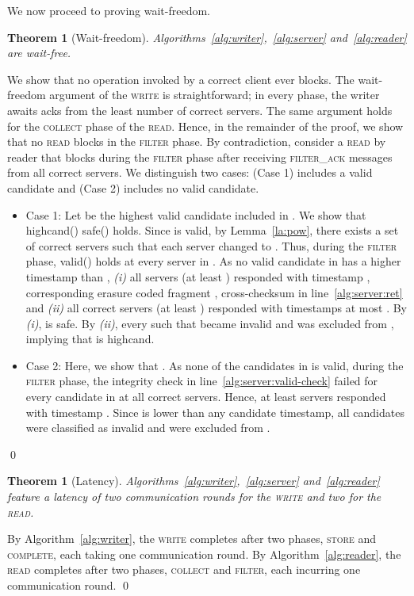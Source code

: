 \documentclass[10pt,conference,compsocconf]{IEEEtran}
\newcommand{\complete}{\textsc{complete}}
\newtheorem{theo}[defn]{Theorem}
\newenvironment{prooff}{\vspace{1ex}\noindent{\bf Proof:}\hspace{0.5em}}
	{\hfill\qed\vspace{1em}}
\begin{document}
We now proceed to proving wait-freedom.
\begin{theo}[Wait-freedom] Algorithms~\ref{alg:writer},~\ref{alg:server} and~\ref{alg:reader} are wait-free.
\end{theo}
\begin{prooff} We show that no operation invoked by a correct client ever blocks. The wait-freedom argument of the \textsc{write} is straightforward; in every phase, the writer awaits acks from the least number  of correct servers. The same argument holds for the \textsc{collect} phase of the \textsc{read}. Hence, in the remainder of the proof, we show that no \textsc{read} blocks in the \textsc{filter} phase. By contradiction, consider a \textsc{read}  by reader  that blocks during the \textsc{filter} phase after receiving \textsc{filter\_ack} messages from all correct servers. We distinguish two cases: (Case 1)  includes a valid candidate and (Case 2)  includes no valid candidate.

\begin{itemize}
\item Case 1: Let  be the highest valid candidate included in . We show that \textsf{highcand}()  \textsf{safe}() holds. Since  is valid, by Lemma~\ref{la:pow}, there exists a set  of  correct servers such that each server  changed  to . Thus, during the \textsc{filter} phase, \textsf{valid}() holds at every server in . As no valid candidate in  has a higher timestamp than , \textit{(i)} all servers  (at least ) responded with timestamp , corresponding erasure coded fragment , cross-checksum  in line~\ref{alg:server:ret} and \textit{(ii)} all correct servers (at least ) responded with timestamps at most . By \emph{(i)},  is \textsf{safe}. By \emph{(ii)}, every  such that  became \textsf{invalid} and was excluded from , implying that  is \textsf{highcand}.

\item Case 2: Here, we show that . As none of the candidates in  is valid, during the \textsc{filter} phase, the integrity check in line~\ref{alg:server:valid-check} failed for every candidate in  at all correct servers. Hence, at least  servers responded with timestamp . Since  is lower than any candidate timestamp, all candidates were classified as \textsf{invalid} and were excluded from .
\end{itemize}
\end{prooff}



\begin{theo}[Latency]
Algorithms~\ref{alg:writer},~\ref{alg:server} and~\ref{alg:reader} feature a latency of \emph{two} communication rounds for the \textsc{write} and \emph{two} for the \textsc{read}.
\end{theo}
\begin{prooff} By Algorithm~\ref{alg:writer}, the \textsc{write} completes after two phases, \textsc{store} and \textsc{\complete}, each taking one communication round. By Algorithm~\ref{alg:reader}, the \textsc{read} completes after two phases, \textsc{collect} and \textsc{filter}, each incurring one communication round.
\end{prooff}
\end{document}
